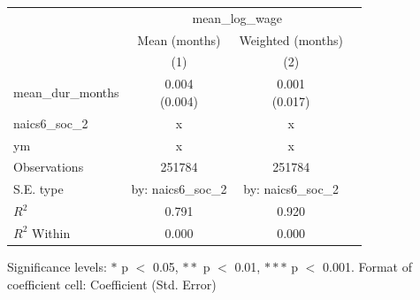 \renewcommand\cellalign{t}
\begin{threeparttable}
\begin{tabular}{lccc}
\toprule
 & \multicolumn{2}{c}{mean_log_wage} \\
\cmidrule(lr){2-3} 
 & Mean (months) & Weighted (months) \\
 & (1) & (2) \\
\midrule
\addlinespace
mean_dur_months & \makecell{0.004 \\ (0.004)} & \makecell{0.001 \\ (0.017)} \\
\midrule
\addlinespace
naics6_soc_2 & x & x \\
ym & x & x \\
\midrule
\addlinespace
Observations & 251784 & 251784 \\
S.E. type & by: naics6_soc_2 & by: naics6_soc_2 \\
$R^2$ & 0.791 & 0.920 \\
$R^2$ Within & 0.000 & 0.000 \\
\bottomrule
\end{tabular}
\footnotesize Significance levels: $*$ p $<$ 0.05, $**$ p $<$ 0.01, $***$ p $<$ 0.001. Format of coefficient cell: Coefficient 
 (Std. Error)
\end{threeparttable}